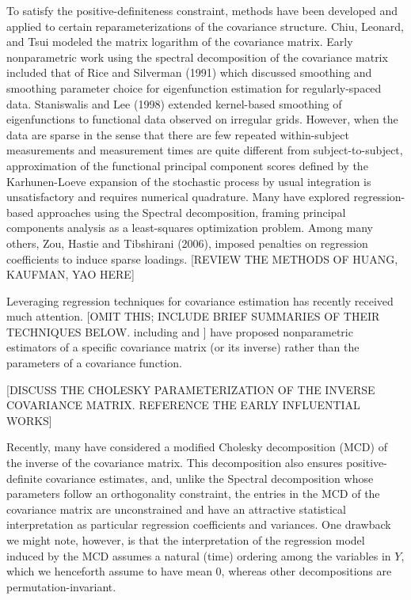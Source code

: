 \documentclass[12pt]{article}
\newcommand*\needsparaphrased{\color{red}}
\begin{document}
To satisfy the positive-definiteness constraint, methods have been developed and applied to certain reparameterizations of the covariance structure. Chiu, Leonard, and Tsui modeled the matrix logarithm of the covariance matrix. Early nonparametric work using the spectral decomposition of the covariance matrix included that of Rice and Silverman (1991) which discussed smoothing and smoothing parameter choice for eigenfunction estimation for regularly-spaced data. Staniswalis and Lee (1998) extended kernel-based smoothing of eigenfunctions to functional data observed on irregular grids. However, when the data are sparse in the sense that there are few repeated within-subject measurements and measurement times are quite different from subject-to-subject, approximation of the functional principal component scores defined by the Karhunen-Loeve expansion of the stochastic process by usual integration is unsatisfactory and requires numerical quadrature. Many have explored regression-based approaches using the Spectral decomposition, framing principal components analysis as a least-squares optimization problem. Among many others, Zou, Hastie and Tibshirani (2006), imposed penalties on regression coefficients to induce sparse loadings. {\needsparaphrased[REVIEW THE METHODS OF HUANG, KAUFMAN, YAO HERE]}


Leveraging regression techniques for covariance estimation has recently received much attention.  {[\needsparaphrased OMIT THIS; INCLUDE BRIEF SUMMARIES OF THEIR TECHNIQUES BELOW. including \citet{bickel2008regularized} and \citet{huang2006covariance}}] have proposed nonparametric estimators of a specific covariance matrix (or its inverse) rather than the parameters of a covariance function. 

{\needsparaphrased[DISCUSS THE CHOLESKY PARAMETERIZATION OF THE INVERSE COVARIANCE MATRIX. REFERENCE THE EARLY INFLUENTIAL WORKS]}

Recently, many have considered a modified Cholesky decomposition (MCD) of the inverse of the covariance matrix. This decomposition also ensures positive-definite covariance estimates, and, unlike the Spectral decomposition whose parameters follow an orthogonality constraint, the entries in the MCD of the covariance matrix are unconstrained and have an attractive statistical interpretation as particular regression coefficients and variances.  One drawback we might note, however, is that the interpretation of  the regression model induced by the MCD assumes a natural (time) ordering among the variables in $Y$, which we henceforth assume to have mean $0$, whereas other decompositions are permutation-invariant.
\end{document}
